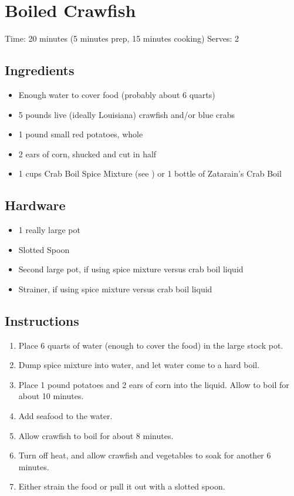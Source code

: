 \section{Boiled Crawfish}
\label{boiledCrawfish}
\setcounter{secnumdepth}{0}
Time: 20 minutes (5 minutes prep, 15 minutes cooking)
Serves: 2

\begin{multicols}{2}
\subsection*{Ingredients}
\begin{itemize}
    \item Enough water to cover food (probably about 6 quarts)
    \item 5 pounds live (ideally Louisiana) crawfish and/or blue crabs
    \item 1 pound small red potatoes, whole
    \item 2 ears of corn, shucked and cut in half
    \item 1 cups Crab Boil Spice Mixture (see ) or 1 bottle of Zatarain's Crab Boil
\end{itemize}

\subsection*{Hardware}
\begin{itemize}
    \item 1 really large pot
    \item Slotted Spoon
    \item Second large pot, if using spice mixture versus crab boil liquid
    \item Strainer, if using spice mixture versus crab boil liquid
\end{itemize}
\clearpage

\subsection*{Instructions}
\begin{enumerate}
    \item Place 6 quarts of water (enough to cover the food) in the large stock pot.
    \item Dump spice mixture into water, and let water come to a hard boil.
    \item Place 1 pound potatoes and 2 ears of corn into the liquid. Allow to boil for about 10 minutes.
    \item Add seafood to the water.
    \item Allow crawfish to boil for about 8 minutes.
    \item Turn off heat, and allow crawfish and vegetables to soak for another 6 minutes.
    \item Either strain the food or pull it out with a slotted spoon.


\end{enumerate}
\end{multicols}
